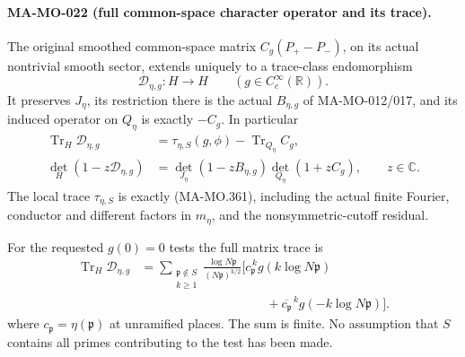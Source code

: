 \paragraph{MA-MO-022 (full common-space character operator and its trace).}
The original smoothed common-space matrix
\(C_g(P_+-P_-)\), on its actual nontrivial smooth sector,
extends uniquely to a trace-class endomorphism
\[
          \mathscr D_{\eta,g}:H\longrightarrow H
                    \qquad(g\in C_c^\infty(\mathbb R)).
 \tag{MA-MO.473}
\]
It preserves \(J_\eta\), its restriction there is the
actual \(B_{\eta,g}\) of MA-MO-012/017, and its induced
operator on \(Q_\eta\) is exactly \(-C_g\). In particular
\[
 \begin{aligned}
 \operatorname{Tr}_H\mathscr D_{\eta,g}
   &=\tau_{\eta,S}(g,\phi)
                         -\operatorname{Tr}_{Q_\eta}C_g,\\
 \det_H(1-z\mathscr D_{\eta,g})
   &=\det_{J_\eta}(1-zB_{\eta,g})
                         \det_{Q_\eta}(1+zC_g),
                   \qquad z\in\mathbb C.
 \end{aligned}
 \tag{MA-MO.474}
\]
The local trace \(\tau_{\eta,S}\) is exactly (MA-MO.361),
including the actual finite Fourier, conductor and different
factors in \(m_\eta\), and the nonsymmetric-cutoff residual.

For the requested \(g(0)=0\) tests the full matrix trace is
\[
 \boxed{\begin{aligned}
 \operatorname{Tr}_H\mathscr D_{\eta,g}
  &=\sum_{\substack{\mathfrak p\notin S\\k\ge1}}
       \frac{\log N\mathfrak p}{(N\mathfrak p)^{k/2}}
       \bigl[c_{\mathfrak p}^{\,k}g(k\log N\mathfrak p)\\
  &\hspace{10em}
       +\overline{c_{\mathfrak p}}^{\,k}g(-k\log N\mathfrak p)\bigr].
 \end{aligned}}
 \tag{MA-MO.475}
\]
where \(c_{\mathfrak p}=\eta(\mathfrak p)\) at unramified
places. The sum is finite. No assumption that \(S\) contains
all primes contributing to the test has been made.

